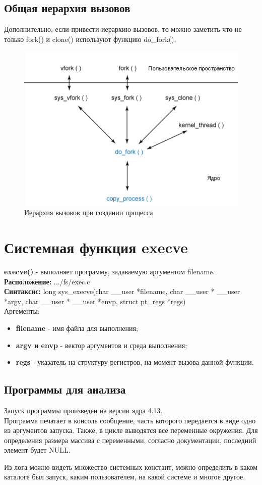 \subsection{Общая иерархия вызовов}
Дополнительно, если привести иерархию вызовов, то можно заметить что не только fork() и clone() используют функцию do\_fork().
\begin{figure}[H]
  \centering
  \includegraphics[width=.65\textwidth]{img/hierarchy}
  \caption{Иерархия вызовов при создании процесса}
\end{figure}


\section{Системная функция execve}
\textbf{execve()}\cite{execve} - выполняет программу, задаваемую аргументом filename.\\
\textbf{Расположение: }.../fs/exec.c\\
\textbf{Синтаксис: } long sys\_execve(char \_\_user *filename, char \_\_user * \_\_user *argv, char \_\_user * \_\_user *envp, struct pt\_regs *regs)\\
Аргементы:
\begin{itemize}
\item \textbf{filename} - имя файла для выполнения;
\item \textbf{argv и envp} - вектор аргументов и среда выполнения;
\item \textbf{regs} - указатель на структуру регистров, на момент вызова данной функции.
\end{itemize}
\subsection{Программы для анализа}
Запуск программы произведен на версии ядра 4.13.\\

Программа печатает в консоль сообщение, часть которого передается в виде одно из аргументов запуска. Также, в цикле выводятся все переменные окружения. Для определения размера массива с переменными, согласно документации, последний элемент будет NULL.


Из лога можно видеть множество системных констант, можно определить в каком каталоге был запуск, каким пользователем, на какой системе и многое другое.
